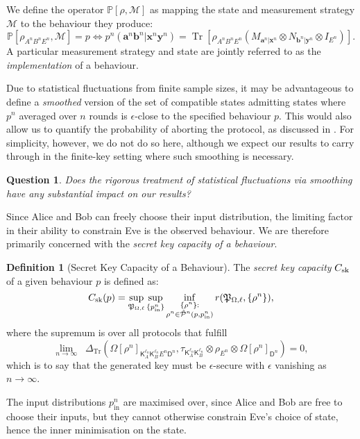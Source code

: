 \documentclass[10pt, a4paper]{article}
\numberwithin{equation}{section} %
\newcounter{stmt} %
\theoremstyle{definition}
\newtheorem{defn}[stmt]{Definition}
\theoremstyle{plain}
\newtheorem{question}{Question}
\newcommand{\?}{\mathrel{?}} %
\newcommand{\cvec}[1]{\boldsymbol{\mathbf{#1}}}    %
\newcommand{\Tr}[2][]{\mathop{\mathrm{Tr}#1}\left[ #2 \right]} %
\newcommand{\Trdist}[2]{\mathop{}\Delta_\mathrm{Tr}\left(#1, #2\right)}
\newcommand{\sM}{\mathcal{M}}
\newcommand{\crv}[1]{\mathsf{#1}}
\newcommand{\compatstates}[3][]{\hat{\mathcal{P}}#1(#2,#3)}
\newcommand{\proto}[2][\ell]{\mathfrak{P}_{#2, #1}}
\newcommand{\prin}[1][p]{#1_{\mathrm{in}}}
\newcommand{\behav}[2]{\mathbb{P}\left[#1, #2\right]}
\newcommand{\sk}{\rm sk}
\begin{document}
    We define the operator \(\behav{\rho}{\sM}\) as mapping the state and measurement strategy \(\sM\) to the behaviour they produce:
    \begin{equation}
      \behav{\rho_{A^n B^n E^n}}{\sM} = p \Leftrightarrow p^n(\cvec{a}^n\cvec{b}^n|\cvec{x}^n\cvec{y}^n) = \Tr{\rho_{A^n B^n E^n} \left(M_{\cvec{a}^n|\cvec{x}^n} \otimes N_{\cvec{b}^n|\cvec{y}^n} \otimes I_{E^n}\right) }.
    \end{equation}
    A particular measurement strategy and state are jointly referred to as the \emph{implementation} of a behaviour.

    Due to statistical fluctuations from finite sample sizes, it may be advantageous to define a \emph{smoothed} version of the set of compatible states admitting states where \(p^n\) averaged over \(n\) rounds is \(\epsilon\)-close to the specified behaviour \(p\). This would also allow us to quantify the probability of aborting the protocol, as discussed in . For simplicity, however, we do not do so here, although we expect our results to carry through in the finite-key setting where such smoothing is necessary.
    \begin{question}
      Does the rigorous treatment of statistical fluctuations via smoothing have any substantial impact on our results?
    \end{question}

    Since Alice and Bob can freely choose their input distribution, the limiting factor in their ability to constrain Eve is the observed behaviour. We are therefore primarily concerned with the \emph{secret key capacity of a behaviour}.
    \begin{defn}[Secret Key Capacity of a Behaviour]\label{def:seckeycapbehav}
      The \emph{secret key capacity} \(C_{\sk}\) of a given behaviour \(p\) is defined as:
      \begin{equation}
        C_{\sk}(p) = \sup_{\proto{\Omega}} \sup_{\{\prin^n\}} \inf_{\substack{\{\rho^{n}\} : \\ \rho^{n} \in \compatstates[^n]{p}{\prin^n}}} r(\proto{\Omega}, \{\rho^{n}\}),
      \end{equation}
      where the supremum is over all protocols that fulfill
      \begin{equation}
        \lim_{n\to\infty} \Trdist{{\Omega[\rho^n]}_{\crv{K}_{A}^{\ell_n} \crv{K}_{B}^{\ell_n} E^n \crv{D}^n}}{\tau_{\crv{K}_{A}^{\ell_n} \crv{K}_{B}^{\ell_n}} \otimes \rho_{E^n} \otimes {\Omega[\rho^n]}_{\crv{D}^n}} = 0,
      \end{equation}
      which is to say that the generated key must be \(\epsilon\)-secure with \(\epsilon\) vanishing as \(n\to\infty\).
    \end{defn}
    The input distributions \(\prin^n\) are maximised over, since Alice and Bob are free to choose their inputs, but they cannot otherwise constrain Eve's choice of state, hence the inner minimisation on the state.
\end{document}
